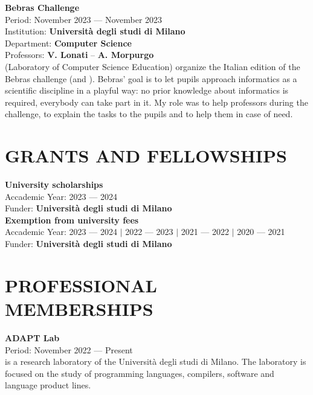 \documentclass[a4paper,9pt]{extarticle}
\begin{document}
\noindent
\textbf{Bebras Challenge} \\
Period: November 2023 --- November 2023 \\
Institution: \textbf{Universit\`a degli studi di Milano} \\
Department: \textbf{Computer Science} \\
Professors: \textbf{V. Lonati} -- \textbf{A. Morpurgo} \\
\aladdin (Laboratory of Computer Science Education) organize the Italian edition of the Bebras challenge (\bebrasit and \bebrasint). Bebras' goal is to let pupils approach informatics as a scientific discipline in a playful way: no prior knowledge about informatics is required, everybody can take part in it.
My role was to help professors during the challenge, to explain the tasks to the pupils and to help them in case of need. \\


\section*{GRANTS AND FELLOWSHIPS}

\noindent
\newline
\textbf{University scholarships} \\
Accademic Year: 2023 --- 2024 \\
Funder: \textbf{Universit\`a degli studi di Milano} \\

\noindent
\newline
\textbf{Exemption from university fees} \\
Accademic Year: 2023 --- 2024 $|$ 2022 --- 2023 $|$ 2021 --- 2022 $|$ 2020 --- 2021 \\
Funder: \textbf{Universit\`a degli studi di Milano} \\


\section*{PROFESSIONAL MEMBERSHIPS}

\noindent
\newline
\textbf{ADAPT Lab} \\
Period: November 2022 --- Present \\
\adaptlab is a research laboratory of the Universit\`a degli studi di Milano. The laboratory is focused on the study of programming languages, compilers, software and language product lines. \\
\end{document}
